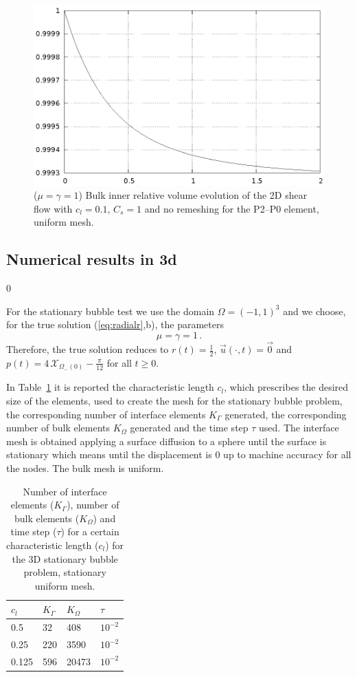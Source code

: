 \documentclass[a4paper,12pt,onecolumn]{article}
\newcommand{\bigchi}{\ensuremath{\mathrm{\mathcal{X}}}}
\newcommand{\charfcn}[1]{\bigchi_{#1}} %
\begin{document}
\begin{figure}[htbp]
  \centering
  \includegraphics[width=.45\textwidth]{images/2d_shear_smooth_bulk_inner_volume.ps}
  \caption{($\mu=\gamma=1$) Bulk inner relative volume evolution of the 2D shear flow with $c_l=0.1$, $C_s=1$ and no remeshing for the P2--P0 element, uniform mesh.}
  \label{fig:shear_2d_smooth_bulk_inner_volume}
\end{figure}

\subsection{Numerical results in 3d} \label{subsec:numerical_results_3d}
\setcounter{equation} 0

For the stationary bubble test we use the domain $\Omega = (-1,1)^3$ and we choose, for the true solution (\ref{eq:radialr},b), the parameters
\begin{equation*}
\mu = \gamma = 1\,. 
\end{equation*}
Therefore, the true solution reduces to $r(t) = \frac{1}{2}$, $\vec u(\cdot, t) = \vec 0$ and $p(t) = 4\,\charfcn{\Omega_-(0)} - \frac{\pi}{12}$ for all $t\geq0$.

In Table~\ref{tab:bubble3Delements} it is reported the characteristic length $c_l$, which prescribes the desired size of the elements, used to create the mesh for the stationary bubble problem, the corresponding number of interface elements $K_\Gamma$ generated, the corresponding number of bulk elements $K_\Omega$ generated and the time step $\tau$ used. The interface mesh is obtained applying a surface diffusion to a sphere until the surface is stationary which means until the displacement is 0 up to machine accuracy for all the nodes. The bulk mesh is uniform.
\begin{table}
 \center
\begin{tabular}{llll}
\hline
$c_l$ & $K_\Gamma$ & $K_\Omega$ & $\tau$ \\
\hline
0.5 & 32 & 408 & $10^{-2}$ \\
0.25 & 220 & 3590 & $10^{-2}$\\
0.125 & 596 & 20473 & $10^{-2}$\\
\hline
\end{tabular}
\caption{Number of interface elements ($K_\Gamma$), number of bulk elements ($K_\Omega$) and time step ($\tau$) for a certain characteristic length ($c_l$) for the 3D stationary bubble problem, stationary uniform mesh.}
\label{tab:bubble3Delements}
\end{table}
\end{document}
